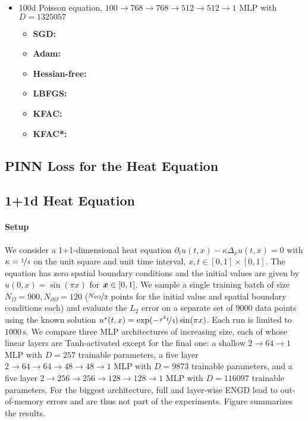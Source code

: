 \begin{itemize}
\item 100d Poisson equation, $100 \to 768 \to 768 \to 512 \to 512 \to 1$ MLP with $D=\num{1325057}$
  \begin{itemize}
    \def\pathToRuns{../kfac_pinns_exp/exp14_poisson_100d_weinan/tex}
  \item \textbf{SGD:} 
  \item \textbf{Adam:} 
  \item \textbf{Hessian-free:} 
  \item \textbf{LBFGS:} 
  \item \textbf{KFAC:} 
  \item \textbf{KFAC*:} 
  \end{itemize}
\end{itemize}

\subsection{PINN Loss for the Heat Equation}\label{sec:pinn-loss-heat-equation}


\subsection{1+1d Heat Equation}\label{sec:1d-heat-equation}

\paragraph{Setup} We consider a 1+1-dimensional heat equation $\partial_tu(t,x) - \kappa \Delta_{x} u(t, x) = 0$ with $\kappa = \nicefrac{1}{4}$ on the unit square and unit time interval, $x, t \in [0,1] \times [0,1]$.
The equation has zero spatial boundary conditions and the initial values are given by $u(0, x) = \sin(\pi x)$ for ${\bm{x}} \in [0,1]$.
We sample a single training batch of size $N_{\Omega} = \num{900}, N_{\partial\Omega} = 120$ ($\nicefrac{N_{\partial\Omega}}{2}$ points for the initial value and spatial boundary conditions each) and evaluate the $L_2$ error on a separate set of $\num{9000}$ data points using the known solution $u^{\star}(t, x) = \exp(-\nicefrac{\pi^2t}{4}) \sin(\pi x)$.
Each run is limited to $\num{1000}\,\text{s}$. We compare three MLP architectures of increasing size, each of whose linear layers are Tanh-activated except for the final one: a shallow $2\to 64\to 1$ MLP with $D=257$ trainable parameters, a five layer $2 \to 64 \to 64 \to 48 \to 48 \to 1$ MLP with $D=\num{9873}$ trainable parameters, and a five layer $2 \to 256 \to 256\to 128 \to 128 \to 1$ MLP with $D=\num{116097}$ trainable parameters.
For the biggest architecture, full and layer-wise ENGD lead to out-of-memory errors and are thus not part of the experiments.
Figure  summarizes the results.

